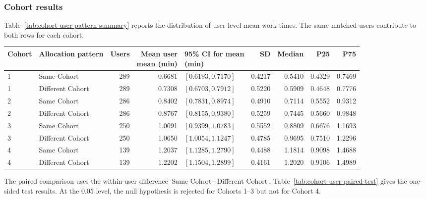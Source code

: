 \subsubsection{Cohort results}
Table~\ref{tab:cohort-user-pattern-summary} reports the distribution of
user-level mean work times. The same matched users contribute to both rows
for each cohort.

\begin{center}
\begin{minipage}{\linewidth}
\centering\fontsize{8}{10}\selectfont
\begin{tabular}{@{}llrrlrrrr@{}}
\toprule
Cohort & Allocation pattern & Users & \shortstack{Mean user\\mean (min)} & \shortstack{95\% CI for mean\\(min)} & SD & Median & P25 & P75 \\
\midrule
1 & Same Cohort      & 289 & 0.6681 & $[0.6193,0.7170]$ & 0.4217 & 0.5410 & 0.4329 & 0.7469 \\
1 & Different Cohort & 289 & 0.7308 & $[0.6703,0.7912]$ & 0.5220 & 0.5909 & 0.4648 & 0.7776 \\
2 & Same Cohort      & 286 & 0.8402 & $[0.7831,0.8974]$ & 0.4910 & 0.7114 & 0.5552 & 0.9312 \\
2 & Different Cohort & 286 & 0.8767 & $[0.8155,0.9380]$ & 0.5259 & 0.7445 & 0.5660 & 0.9848 \\
3 & Same Cohort      & 250 & 1.0091 & $[0.9399,1.0783]$ & 0.5552 & 0.8809 & 0.6676 & 1.1693 \\
3 & Different Cohort & 250 & 1.0650 & $[1.0054,1.1247]$ & 0.4785 & 0.9695 & 0.7510 & 1.2296 \\
4 & Same Cohort      & 139 & 1.2037 & $[1.1285,1.2790]$ & 0.4488 & 1.1814 & 0.9098 & 1.4688 \\
4 & Different Cohort & 139 & 1.2202 & $[1.1504,1.2899]$ & 0.4161 & 1.2020 & 0.9106 & 1.4989 \\
\bottomrule
\end{tabular}
\label{tab:cohort-user-pattern-summary}
\end{minipage}
\end{center}

The paired comparison uses the within-user difference
$\text{Same Cohort}-\text{Different Cohort}$. Table~\ref{tab:cohort-user-paired-test}
gives the one-sided test results. At the 0.05 level, the null hypothesis is
rejected for Cohorts 1--3 but not for Cohort 4.

